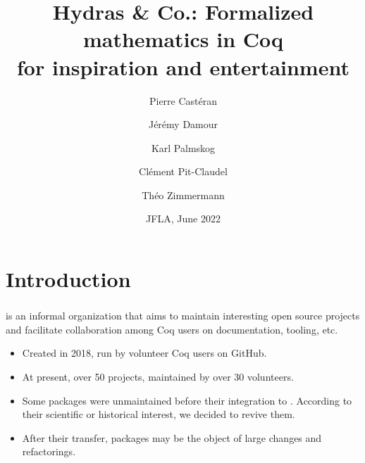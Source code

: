 \documentclass[10pt, fleqn]{beamer}
\title{Hydras \& Co.: Formalized mathematics in Coq\\
  for inspiration and entertainment
}
\date{JFLA, June 2022}
\author{
  Pierre Castéran \inst{1}
  \and
  Jérémy Damour \inst{2}
  \and
  Karl Palmskog \inst{3}
  \and Clément Pit-Claudel \inst{4}
  \and Théo Zimmermann \inst{5}
}
\institute{
  Univ. Bordeaux, CNRS, Bordeaux INP, LaBRI, UMR 5800, F-33400 Talence, France  %
  \and
  Univ. de Paris, F-75013 Paris, France
  \and
  KTH Royal Institute of Technology, Stockholm, Sweden
  \and
  MIT CSAIL, Cambridge, Massachusetts, USA
  \and
  Inria, Univ. de Paris, CNRS, IRIF, UMR 8243, F-75013 Paris, France
}
\begin{document}

\begin{frame}
  \maketitle
\end{frame}

\section{Introduction}
\begin{frame}
    \frametitle{\community}
    \begin{block}{}
      \community is an informal organization that aims to maintain interesting open source \coq projects and facilitate collaboration among Coq users on documentation, tooling, etc.
      \begin{itemize}
      \item Created in 2018,  run by volunteer Coq users on GitHub.
      \item At present, over 50 projects, maintained by over 30 volunteers.
      \item Some packages were unmaintained before their integration to \community. According to their scientific or historical interest, we decided to revive them.
        \item After their transfer, packages may be the object of large changes  and refactorings.
      \end{itemize}
    \end{block}
  \end{frame}
\end{document}
